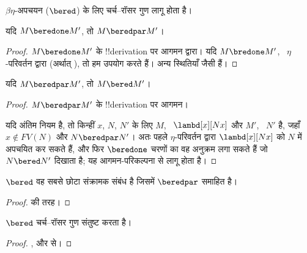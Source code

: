 \documentclass[../../../include/open-logic-section]{subfiles}
\begin{document}


$\beta\eta$-अपचयन ($\bered$) के लिए चर्च--रॉसर गुण लागू होता है।

\begin{lem}
  यदि $M \beredone M'$, तो $M \beredpar M'$।
\end{lem}

\begin{proof} 
  $M \beredone M'$ के !!{derivation} पर आगमन द्वारा। यदि $M \bredone M'$,
  ~$\eta$-परिवर्तन द्वारा (अर्थात्
  ), तो हम  उपयोग करते
  हैं। अन्य स्थितियाँ  जैसी हैं।
\end{proof}


\begin{lem}
  यदि $M \beredpar M'$, तो $M \bered M'$।
\end{lem}

\begin{proof} $M \beredpar M'$ के !!{derivation} पर आगमन।

  यदि अंतिम नियम  है, तो किन्हीं $x$, $N$,
  $N'$ के लिए $M$, ~$\lambd[x][Nx]$ और $M'$, ~$N'$ है, जहाँ $x \notin
  FV(N)$ और $N \beredpar N'$। अतः पहले $\eta$-परिवर्तन द्वारा
  $\lambd[x][Nx]$ को $N$ में अपचयित कर सकते हैं, और फिर $\beredone$ चरणों
  का वह अनुक्रम लगा सकते हैं जो $N \bered N'$ दिखाता है; यह
  आगमन-परिकल्पना से लागू होता है।
\end{proof}


\begin{lem}
  $\bered$ वह सबसे छोटा संक्रामक संबंध है जिसमें $\beredpar$ समाहित है।
\end{lem}

\begin{proof}
   की तरह।
\end{proof}

\begin{thm}
  $\bered$ चर्च--रॉसर गुण संतुष्ट करता है।
\end{thm}

\begin{proof}
  ,  और  से।
\end{proof}
\end{document}
